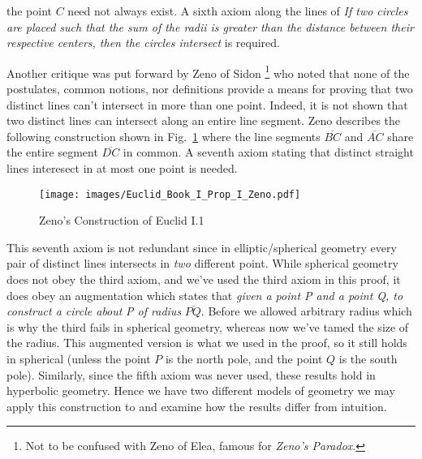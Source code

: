         the point $C$ need not always exist. A sixth axiom along the lines of
        \textit{If two circles are placed such that the sum of the radii is
        greater than the distance between their respective centers, then the
        circles intersect} is required.
        \par\hfill\par
        Another critique was put forward by Zeno of Sidon%
        \footnote{%
            Not to be confused with Zeno of Elea, famous for
            \textit{Zeno's Paradox}.
        }
        who noted that none of the postulates, common notions, nor definitions
        provide a means for proving that two distinct lines can't intersect in
        more than one point. Indeed, it is not shown that two distinct lines can
        intersect along an entire line segment. Zeno describes the following
        construction shown in Fig.~\ref{fig:Zeno_Euclid_I_1} where the line
        segments $\overline{BC}$ and $\overline{AC}$ share the entire segment
        $\overline{DC}$ in common. A seventh axiom stating that distinct
        straight lines interesect in at most one point is needed.%
        \begin{figure}[H]
            \centering
            \captionsetup{type=figure}
            \texttt{[image: images/Euclid\_Book\_I\_Prop\_I\_Zeno.pdf]}
            \caption{Zeno's Construction of Euclid I.1}
            \label{fig:Zeno_Euclid_I_1}
        \end{figure}
        This seventh axiom is not redundant since in elliptic/spherical geometry
        every pair of distinct lines intersects in \textit{two} different point.
        While spherical geometry does not obey the third axiom, and we've used
        the third axiom in this proof, it does obey an augmentation which states
        that \textit{given a point P and a point Q, to construct a circle about}
        \textit{P of radius} $\overline{PQ}$. Before we allowed arbitrary radius
        which is why the third fails in spherical geometry, whereas now we've
        tamed the size of the radius. This augmented version is what we used in
        the proof, so it still holds in spherical (unless the point $P$ is the
        north pole, and the point $Q$ is the south pole). Similarly, since the
        fifth axiom was never used, these results hold in hyperbolic geometry.
        Hence we have two different models of geometry we may apply this
        construction to and examine how the results differ from intuition.
